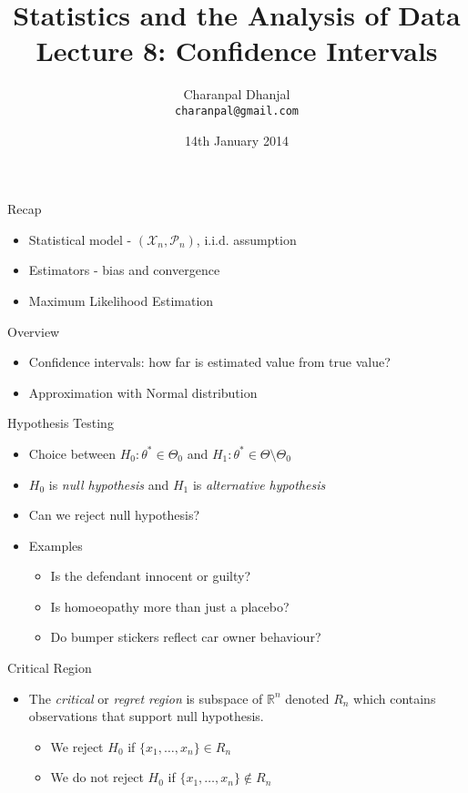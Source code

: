\documentclass{beamer}
\title{Statistics and the Analysis of Data\\ Lecture 8: Confidence Intervals}
\author{Charanpal Dhanjal \\ \texttt{charanpal@gmail.com}}
\institute{\'{E}cole des Ponts}
\date{14th January 2014}
\begin{document}
\frame{\titlepage}

\begin{frame}{Recap}  
\begin{itemize} 
 \item Statistical model - $(\mathcal{X}_n, \mathcal{P}_n)$, i.i.d. assumption 
 \item Estimators - bias and convergence 
 \item Maximum Likelihood Estimation 
\end{itemize} 
\end{frame}

\begin{frame}{Overview}
\begin{itemize} 
 \item Confidence intervals: how far is estimated value from true value? 
\item Approximation with Normal distribution 
\end{itemize}
\end{frame}

\begin{frame}{Hypothesis Testing}  
\begin{itemize} 
\item Choice between $H_0: \theta^* \in \Theta_0$ and $H_1: \theta^* \in \Theta \setminus \Theta_0$
\item $H_0$ is \emph{null hypothesis} and $H_1$ is \emph{alternative hypothesis} 
\item Can we reject null hypothesis? 
\item Examples 
\begin{itemize} 
\item Is the defendant innocent or guilty? 
\item Is homoeopathy more than just a placebo? 
\item Do bumper stickers reflect car owner behaviour? 
\end{itemize}
\end{itemize}
\end{frame}

\begin{frame}{Critical Region} 
\begin{itemize} 
 \item The \emph{critical} or \emph{regret region} is subspace of $\mathbb{R}^n$ denoted $R_n$ which contains observations that support null hypothesis.  
 \begin{itemize}
 \item We reject $H_0$ if $\{x_1, \ldots, x_n\} \in R_n$ 
 \item We do not reject $H_0$ if $\{x_1, \ldots, x_n\} \notin R_n$ 
 \end{itemize} 
\end{itemize}
\end{frame}
\end{document}
